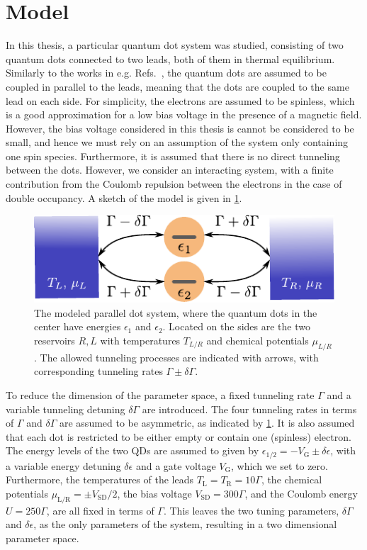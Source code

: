 \documentclass[../main.tex]{subfiles}
\begin{document}
\section{Model}
In this thesis, a particular quantum dot system was studied, consisting of two quantum dots connected to two leads, both of them in thermal equilibrium. Similarly to the works in e.g. Refs.~\cite{doubledot,doubledot2}, the quantum dots are assumed to be coupled in parallel to the leads, meaning that the dots are coupled to the same lead on each side. For simplicity, the electrons are assumed to be spinless, which is a good approximation for a low bias voltage in the presence of a magnetic field. However, the bias voltage considered in this thesis is cannot be considered to be small, and hence we must rely on an assumption of the system only containing one spin species. Furthermore, it is assumed that there is no direct tunneling between the dots. However, we consider an interacting system, with a finite contribution from the Coulomb repulsion between the electrons in the case of double occupancy. A sketch of the model is given in \cref{fig:model}.
\begin{figure}[H] \centering
    \includegraphics[width=0.8\linewidth]{figures/model.pdf}
    \caption{The modeled parallel dot system, where the quantum dots in the center have energies $\epsilon_1$ and $\epsilon_2$. Located on the sides are the two reservoirs $R,L$ with temperatures $T_{L/R}$ and chemical potentials $\mu_{L/R}$. The allowed tunneling processes are indicated with arrows, with corresponding tunneling rates $\Gamma \pm \delta\Gamma$.}
    \label{fig:model}
\end{figure}
To reduce the dimension of the parameter space, a fixed tunneling rate $\Gamma$ and a variable tunneling detuning $\delta\Gamma$ are introduced. The four tunneling rates in terms of $\Gamma$ and $\delta\Gamma$ are assumed to be asymmetric, as indicated by \cref{fig:model}. It is also assumed that each dot is restricted to be either empty or contain one (spinless) electron. The energy levels of the two QDs are assumed to given by $\epsilon_{1/2} = -V_\text{G} \pm \delta\epsilon$, with a variable energy detuning $\delta\epsilon$ and a gate voltage $V_\text{G}$, which we set to zero. Furthermore, the temperatures of the leads $T_\text{L}=T_\text{R}=10\Gamma$, the chemical potentials $\mu_\text{L/R} = \pm V_\text{SD}/2$, the bias voltage $V_\text{SD} = 300\Gamma$, and the Coulomb energy $U = 250\Gamma$, are all fixed in terms of $\Gamma$. This leaves the two tuning parameters, $\delta\Gamma$ and $\delta\epsilon$, as the only parameters of the system, resulting in a two dimensional parameter space. 
\end{document}
